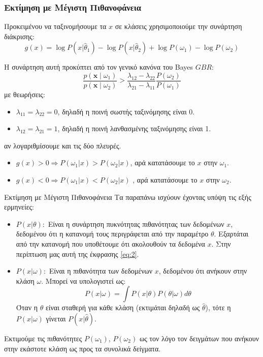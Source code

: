 \documentclass{beamer}
\newcommand{\gr}{\selectlanguage{greek}}
\newcommand{\en}{\selectlanguage{english}}
\begin{document}
\begin{frame}
    \frametitle{Εκτίμηση με Μέγιστη Πιθανοφάνεια}
    
    Προκειμένου να ταξινομήσουμε τα $x$ σε κλάσεις χρησιμοποιούμε την συνάρτηση διάκρισης:
    \[g(x) = \log P(x | \hat{\theta}_1) - \log P(x | \hat{\theta}_2) + \log P(\omega_1) - \log P(\omega_2)\]

    Η συνάρτηση αυτή προκύπτει από τον γενικό κανόνα του \en Bayes $GBR$: \gr 
    \[\frac{p(\mathbf{x} \mid \omega_1)}{p(\mathbf{x} \mid \omega_2)} > \frac{\lambda_{12} - \lambda_{22}}{\lambda_{21} - \lambda_{11}} \frac{P(\omega_2)}{P(\omega_1)} \]
    με θεωρήσεις:

    \begin{itemize}
        \item $\lambda_{11} = \lambda_{22} = 0$, δηλαδή η ποινή σωστής ταξινόμησης είναι 0.
        \item $\lambda_{12} = \lambda_{21} = 1$, δηλαδή η ποινή λανθασμένης ταξινόμησης είναι 1.
    \end{itemize}

    αν λογαριθμίσουμε και τις δύο πλευρές.

    \begin{itemize}
        \item  $g(x) > 0 \Rightarrow P(\omega_1|x) > P(\omega_2|x)$, αρά κατατάσουμε το $x$ στην $\omega_1$.
        \item $g(x) < 0 \Rightarrow P(\omega_1|x) <  P(\omega_2|x)$ , αρά κατατάσουμε το $x$ στην $\omega_2$.
    \end{itemize}

    
\end{frame}

\begin{frame}{Εκτίμηση με Μέγιστη Πιθανοφάνεια}
\small
    Τα παραπάνω ισχύουν έχοντας υπόψη τις εξής ερμηνείες:
    \begin{itemize}
        \item $P(x|\theta):$ Είναι η συνάρτηση πυκνότητας πιθανότητας των δεδομένων $x$, δεδομένου ότι η κατανομή τους περιγράφεται από την παραμέτρο $\theta$. Εξαρτάται από την κατανομή που υποθέτουμε ότι ακολουθούν τα δεδομένα $x$. Στην περίπτωση μας αυτή της έκφρασης \ref{eq:2}. 
        \item $P(x|\omega):$ Είναι η πιθανότητα των δεδομένων $x$, δεδομένου ότι ανήκουν στην κλάση $\omega$. Μπορεί να υπολογιστεί ως:
        \[P(x|\omega) = \int P(x|\theta) P(\theta|\omega)d\theta\]
        Όταν η $\theta$ είναι σταθερή για κάθε κλάση (εκτιμάται δηλαδή ως $\hat\theta$), τότε η $P(x|\omega)$ γίνεται $P(x|\hat\theta).$
    \end{itemize}


    Εκτιμούμε τις πιθανότητες $P(\omega_1)$, $P(\omega_2)$ ως τον λόγο τον δειγμάτων που ανήκουν στην εκάστοτε κλάση ως προς τα συνολικά δείγματα.
\end{frame}
\end{document}
